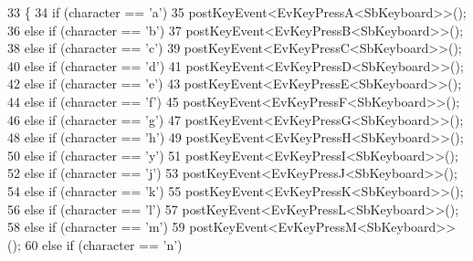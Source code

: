 \begin{DoxyCode}
33         \{
34                 \textcolor{keywordflow}{if} (character == \textcolor{charliteral}{'a'})
35                         postKeyEvent<EvKeyPressA<SbKeyboard>>();
36                 \textcolor{keywordflow}{else} \textcolor{keywordflow}{if} (character == \textcolor{charliteral}{'b'})
37                         postKeyEvent<EvKeyPressB<SbKeyboard>>();
38                 \textcolor{keywordflow}{else} \textcolor{keywordflow}{if} (character == \textcolor{charliteral}{'c'})
39                         postKeyEvent<EvKeyPressC<SbKeyboard>>();
40                 \textcolor{keywordflow}{else} \textcolor{keywordflow}{if} (character == \textcolor{charliteral}{'d'})
41                         postKeyEvent<EvKeyPressD<SbKeyboard>>();
42                 \textcolor{keywordflow}{else} \textcolor{keywordflow}{if} (character == \textcolor{charliteral}{'e'})
43                         postKeyEvent<EvKeyPressE<SbKeyboard>>();
44                 \textcolor{keywordflow}{else} \textcolor{keywordflow}{if} (character == \textcolor{charliteral}{'f'})
45                         postKeyEvent<EvKeyPressF<SbKeyboard>>();
46                 \textcolor{keywordflow}{else} \textcolor{keywordflow}{if} (character == \textcolor{charliteral}{'g'})
47                         postKeyEvent<EvKeyPressG<SbKeyboard>>();
48                 \textcolor{keywordflow}{else} \textcolor{keywordflow}{if} (character == \textcolor{charliteral}{'h'})
49                         postKeyEvent<EvKeyPressH<SbKeyboard>>();
50                 \textcolor{keywordflow}{else} \textcolor{keywordflow}{if} (character == \textcolor{charliteral}{'y'})
51                         postKeyEvent<EvKeyPressI<SbKeyboard>>();
52                 \textcolor{keywordflow}{else} \textcolor{keywordflow}{if} (character == \textcolor{charliteral}{'j'})
53                         postKeyEvent<EvKeyPressJ<SbKeyboard>>();
54                 \textcolor{keywordflow}{else} \textcolor{keywordflow}{if} (character == \textcolor{charliteral}{'k'})
55                         postKeyEvent<EvKeyPressK<SbKeyboard>>();
56                 \textcolor{keywordflow}{else} \textcolor{keywordflow}{if} (character == \textcolor{charliteral}{'l'})
57                         postKeyEvent<EvKeyPressL<SbKeyboard>>();
58                 \textcolor{keywordflow}{else} \textcolor{keywordflow}{if} (character == \textcolor{charliteral}{'m'})
59                         postKeyEvent<EvKeyPressM<SbKeyboard>>();
60                 \textcolor{keywordflow}{else} \textcolor{keywordflow}{if} (character == \textcolor{charliteral}{'n'})

\end{DoxyCode}
